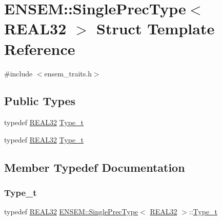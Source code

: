 \hypertarget{structENSEM_1_1SinglePrecType_3_01REAL32_01_4}{}\section{E\+N\+S\+EM\+:\+:Single\+Prec\+Type$<$ R\+E\+A\+L32 $>$ Struct Template Reference}
\label{structENSEM_1_1SinglePrecType_3_01REAL32_01_4}


{\ttfamily \#include $<$ensem\+\_\+traits.\+h$>$}

\subsection*{Public Types}
\begin{DoxyCompactItemize}
\item 
typedef \mbox{\hyperlink{namespaceENSEM_a7540d01191172323e9073283d772576d}{R\+E\+A\+L32}} \mbox{\hyperlink{structENSEM_1_1SinglePrecType_3_01REAL32_01_4_a57e2eac17849fab0603ae555b6a2139b}{Type\+\_\+t}}
\item 
typedef \mbox{\hyperlink{namespaceENSEM_a7540d01191172323e9073283d772576d}{R\+E\+A\+L32}} \mbox{\hyperlink{structENSEM_1_1SinglePrecType_3_01REAL32_01_4_a57e2eac17849fab0603ae555b6a2139b}{Type\+\_\+t}}
\end{DoxyCompactItemize}


\subsection{Member Typedef Documentation}
\mbox{\label{structENSEM_1_1SinglePrecType_3_01REAL32_01_4_a57e2eac17849fab0603ae555b6a2139b}} 
\subsubsection{\texorpdfstring{Type\_t}{Type\_t}\hspace{0.1cm}{\footnotesize\ttfamily [1/2]}}
{\footnotesize\ttfamily typedef \mbox{\hyperlink{namespaceENSEM_a7540d01191172323e9073283d772576d}{R\+E\+A\+L32}} \mbox{\hyperlink{structENSEM_1_1SinglePrecType}{E\+N\+S\+E\+M\+::\+Single\+Prec\+Type}}$<$ \mbox{\hyperlink{namespaceENSEM_a7540d01191172323e9073283d772576d}{R\+E\+A\+L32}} $>$\+::\mbox{\hyperlink{structENSEM_1_1SinglePrecType_3_01REAL32_01_4_a57e2eac17849fab0603ae555b6a2139b}{Type\+\_\+t}}}

